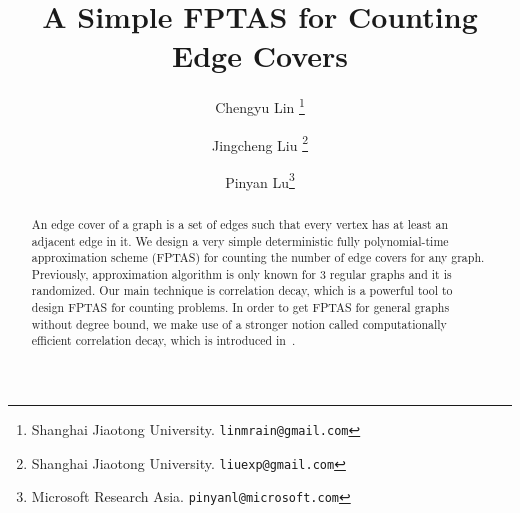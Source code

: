 \documentclass[twoside,leqno,twocolumn]{article}
\title{A Simple FPTAS for Counting Edge Covers}
\date{}
\begin{document}
\author{
	Chengyu Lin
	\thanks{Shanghai Jiaotong University. {\tt linmrain@gmail.com}}
	\and
	Jingcheng Liu
	\thanks{Shanghai Jiaotong University. {\tt liuexp@gmail.com}}
	\and
	Pinyan Lu\thanks{Microsoft Research Asia. {\tt pinyanl@microsoft.com}}
}
\maketitle
\begin{abstract}
An edge cover of a graph is a set of edges such that every vertex has at least an adjacent edge in it. We design a very simple deterministic fully polynomial-time approximation scheme  (FPTAS) for counting the number of edge covers for any graph. Previously, approximation algorithm is only known for 3 regular graphs and it is randomized. Our main technique is correlation decay, which is a powerful tool to design FPTAS for counting problems. In order to get FPTAS for general graphs without degree bound, we make use of a stronger notion called computationally efficient correlation decay, which is introduced in~\cite{LLY12}.
\end{abstract}
















\end{document}
